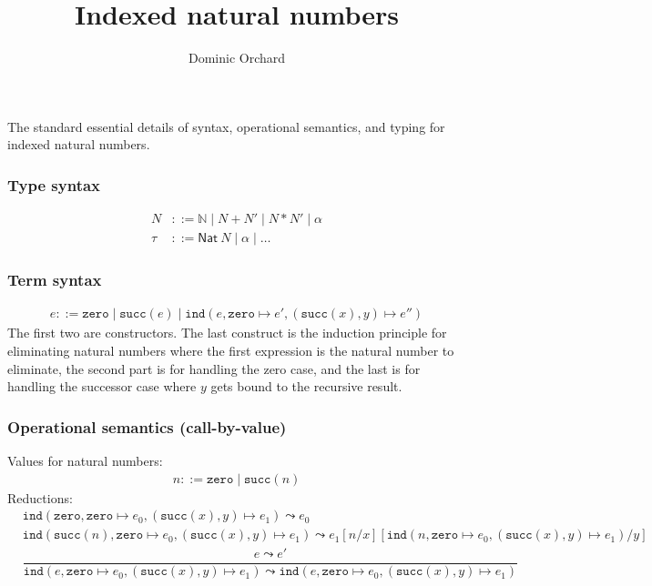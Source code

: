 \documentclass[10pt]{article}
\title{Indexed natural numbers}
\author{Dominic Orchard}
\newcommand{\ind}[5]{\texttt{ind}(#1, \texttt{zero} \mapsto #2, (\texttt{succ}(#3), #4) \mapsto #5)}
\begin{document}
\maketitle

\noindent
The standard essential details of syntax, operational semantics, and typing for indexed natural numbers.

\subsubsection*{Type syntax}
\begin{align}
\tag{type-level naturals}
N & ::= \mathbb{N} \mid N + N' \mid N * N' \mid \alpha \\
\tag{types} 
\tau & ::= \mathsf{Nat}\ N \mid \alpha \mid \ldots 
\end{align}

\subsubsection*{Term syntax}
\begin{align*}
e ::= \texttt{zero} \mid \texttt{succ}(e) \mid \ind{e}{e'}{x}{y}{e''}
\end{align*}
The first two are constructors. The last construct is the induction principle for eliminating
natural numbers where the first expression is the natural number to eliminate,
the second part is for handling the zero case, and the last is for handling
the successor case where $y$ gets bound to the recursive result.

\subsubsection*{Operational semantics (call-by-value)}

Values for natural numbers:
\begin{align*}
n ::= \texttt{zero} \mid \texttt{succ}(n)
\end{align*}
%
Reductions:
\begin{align*}
& \ind{\texttt{zero}}{e_0}{x}{y}{e_1} \leadsto e_0
\\[2em]
& \ind{\texttt{succ}(n)}{e_0}{x}{y}{e_1} \leadsto e_1[n/x][\ind{n}{e_0}{x}{y}{e_1}/y]
\\[2em]
& \dfrac{e \leadsto e'}{\ind{e}{e_0}{x}{y}{e_1} \leadsto \ind{e}{e_0}{x}{y}{e_1}}
\end{align*}
\end{document}
